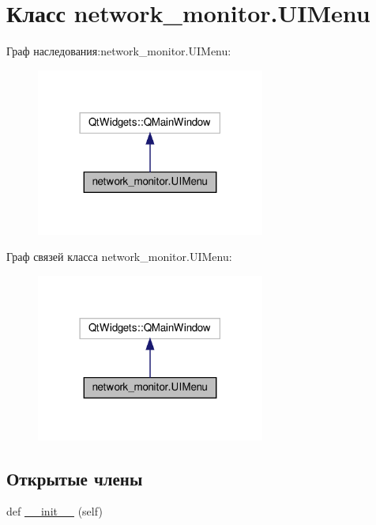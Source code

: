 \hypertarget{classnetwork__monitor_1_1_u_i_menu}{}\section{Класс network\+\_\+monitor.\+U\+I\+Menu}
\label{classnetwork__monitor_1_1_u_i_menu}


Граф наследования\+:network\+\_\+monitor.\+U\+I\+Menu\+:\nopagebreak
\begin{figure}[H]
\begin{center}
\leavevmode
\includegraphics[width=213pt]{classnetwork__monitor_1_1_u_i_menu__inherit__graph}
\end{center}
\end{figure}


Граф связей класса network\+\_\+monitor.\+U\+I\+Menu\+:\nopagebreak
\begin{figure}[H]
\begin{center}
\leavevmode
\includegraphics[width=213pt]{classnetwork__monitor_1_1_u_i_menu__coll__graph}
\end{center}
\end{figure}
\subsection*{Открытые члены}
\begin{DoxyCompactItemize}
\item 
def \hyperlink{classnetwork__monitor_1_1_u_i_menu_a2747f83c587a0d29338be7d190c7ab0c}{\+\_\+\+\_\+init\+\_\+\+\_\+} (self)
\end{DoxyCompactItemize}


